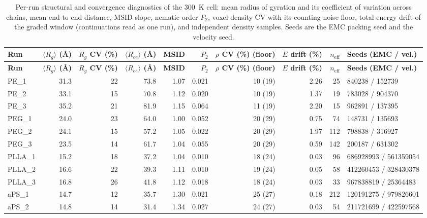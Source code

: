 \scriptsize
\begin{longtable}{l r r r r r r r r l}
\caption{Per-run structural and convergence diagnostics of the 300~K cell: mean radius of gyration and its coefficient of variation across chains, mean end-to-end distance, MSID slope, nematic order $P_2$, voxel density CV with its counting-noise floor, total-energy drift of the graded window (continuations read as one run), and independent density samples. Seeds are the EMC packing seed and the velocity seed.} \label{tab:si_struct} \\
\toprule
\textbf{Run} & \textbf{$\langle R_g\rangle$ (\AA)} & \textbf{$R_g$ CV (\%)} & \textbf{$\langle R_{ee}\rangle$ (\AA)} & \textbf{MSID} & \textbf{$P_2$} & \textbf{$\rho$ CV (\%) (floor)} & \textbf{$E$ drift (\%)} & \textbf{$n_{\mathrm{eff}}$} & \textbf{Seeds (EMC / vel.)} \\
\midrule
\endfirsthead
\toprule
\textbf{Run} & \textbf{$\langle R_g\rangle$ (\AA)} & \textbf{$R_g$ CV (\%)} & \textbf{$\langle R_{ee}\rangle$ (\AA)} & \textbf{MSID} & \textbf{$P_2$} & \textbf{$\rho$ CV (\%) (floor)} & \textbf{$E$ drift (\%)} & \textbf{$n_{\mathrm{eff}}$} & \textbf{Seeds (EMC / vel.)} \\
\midrule
\endhead
\bottomrule
\endfoot
PE\_1 & 31.3 & 22 & 73.8 & 1.07 & 0.021 & 10 (19) & 2.26 & 25 & 840238 / 152739 \\
PE\_2 & 33.1 & 15 & 70.8 & 1.12 & 0.020 & 10 (19) & 1.37 & 19 & 783028 / 904370 \\
PE\_3 & 35.2 & 21 & 81.9 & 1.15 & 0.064 & 11 (19) & 2.20 & 15 & 962891 / 137395 \\
PEG\_1 & 24.0 & 23 & 64.0 & 1.00 & 0.052 & 20 (29) & 0.75 & 74 & 148731 / 135693 \\
PEG\_2 & 24.1 & 15 & 57.2 & 1.05 & 0.022 & 20 (29) & 1.97 & 112 & 798838 / 316927 \\
PEG\_3 & 23.5 & 14 & 61.7 & 1.04 & 0.055 & 20 (29) & 0.59 & 142 & 200187 / 631302 \\
PLLA\_1 & 15.2 & 18 & 37.2 & 1.04 & 0.010 & 18 (24) & 0.03 & 96 & 686928993 / 561359054 \\
PLLA\_2 & 16.6 & 22 & 39.3 & 1.11 & 0.010 & 19 (24) & 0.05 & 58 & 412260453 / 328430378 \\
PLLA\_3 & 16.8 & 26 & 41.8 & 1.12 & 0.018 & 18 (24) & 0.03 & 33 & 967838819 / 25364483 \\
aPS\_1 & 14.7 & 12 & 35.7 & 1.30 & 0.021 & 25 (27) & 0.18 & 212 & 120191275 / 979826601 \\
aPS\_2 & 14.8 & 14 & 31.4 & 1.34 & 0.027 & 24 (27) & 0.03 & 54 & 211721699 / 422597568 \\

\end{longtable}
